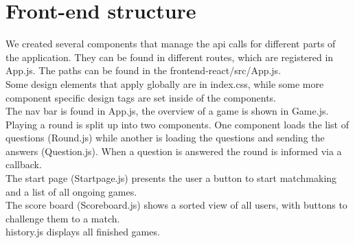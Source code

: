 \chapter{Front-end structure}
We created several components that manage the api calls for different parts of the application. They can be found in different routes, which are registered in App.js. The paths can be found in the frontend-react/src/App.js. \\
Some design elements that apply globally are in index.css, while some more component specific design tags are set inside of the components.\\

 The nav bar is found in App.js, the overview of a game is shown in Game.js. Playing a round is split up into two components. One component loads the list of questions (Round.js) while another is loading the questions and sending the answers (Question.js). When a question is answered the round is informed via a callback.\\
 The start page (Startpage.js) presents the user a button to start matchmaking and a list of all ongoing games.\\
 The score board (Scoreboard.js) shows a sorted view of all users, with buttons to challenge them to a match.\\
 history.js displays all finished games.